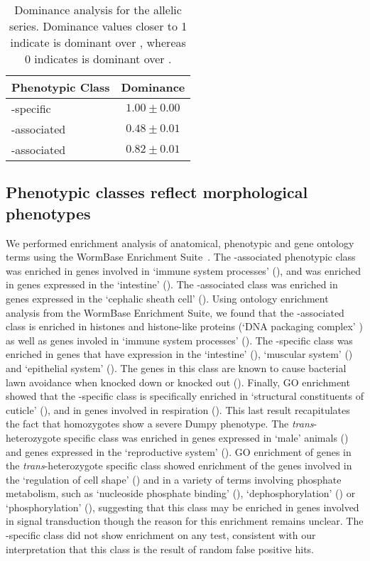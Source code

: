 \begin{table}
  \centering
  \begin{tabular}{lc}
    \toprule
    Phenotypic Class & Dominance\\
    \midrule
    \sy{}-specific & $1.00\pm0.00$\\
    \sy{}-associated & $0.48\pm0.01$\\
    \bx{}-associated & $0.82\pm0.01$\\
    \bottomrule
  \end{tabular}
  \caption{
           Dominance analysis for the  allelic series. Dominance
           values closer to 1 indicate \bx{} is dominant over \sy{}, whereas 0
           indicates \sy{} is dominant over \bx{}.
          }
\label{tab:dom}
\end{table}

\subsection*{Phenotypic classes reflect morphological phenotypes}
We performed enrichment analysis of anatomical, phenotypic and gene ontology
terms using the WormBase Enrichment Suite~\citep{Angeles-Albores2016,
Angeles-Albores2018a}. The \bx{}-associated phenotypic class was enriched in
genes involved in `immune system processes' (), and was enriched in
genes expressed in the `intestine' (). The \sy{}-associated
class was enriched in genes expressed in the `cephalic sheath
cell' (). Using ontology enrichment analysis from the WormBase
Enrichment Suite, we found that the \sy{}-associated class is enriched in
histones and histone-like proteins (`DNA packaging complex' ) as well as
genes involed in `immune system processes' (). The \sy{}-specific class
was enriched in genes that have expression in the `intestine' (),
`muscular system' () and `epithelial system' (). The genes in
this class are known to cause bacterial lawn avoidance when knocked down or
knocked out (). Finally, GO enrichment showed that the \sy{}-specific
class is specifically enriched in `structural constituents of cuticle'
(), and in genes involved in respiration (). This last result
recapitulates the fact that \sy{} homozygotes show a severe Dumpy phenotype. The
\emph{trans}-heterozygote specific class was enriched in genes expressed in
`male' animals () and genes expressed in the `reproductive system'
(). GO enrichment of genes in the \emph{trans}-heterozygote specific
class showed enrichment of the genes involved in the `regulation of cell shape'
() and in a variety of terms involving phosphate metabolism, such as
`nucleoside phosphate binding' (), `dephosphorylation' () or
`phosphorylation' (), suggesting that this class may be enriched in
genes involved in signal transduction though the reason for this enrichment
remains unclear. The \bx{}-specific class did not show enrichment on any test,
consistent with our interpretation that this class is the result of random false
positive hits.

